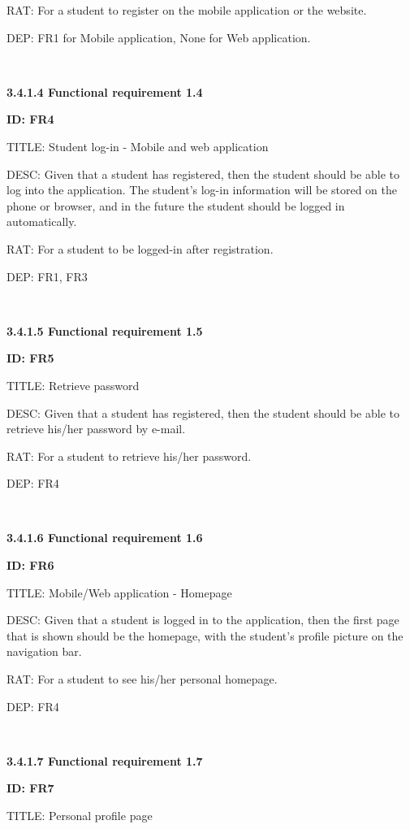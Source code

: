 \documentclass[12pt,a4paper]{article}
\begin{document}
\begin{flushleft}
        RAT: For a student to register on the mobile application or the website.

        DEP: FR1 for Mobile application, None for Web application.


        \
\newpage


        \textbf{3.4.1.4 Functional requirement 1.4}

        \textbf{ID: FR4}

        TITLE: Student log-in - Mobile and web application

        DESC: Given that a student has registered, then the student should be
        able to log into the application. The student's log-in information will
        be stored on the phone or browser, and in the future the student should
        be logged in automatically.

        RAT: For a student to be logged-in after registration.

        DEP: FR1, FR3


        \

        \textbf{3.4.1.5 Functional requirement 1.5}

        \textbf{ID: FR5}

        TITLE: Retrieve password

        DESC: Given that a student has registered, then the student should be
        able to retrieve his/her password by e-mail.

        RAT: For a student to retrieve his/her password.

        DEP: FR4

        \

        \textbf{3.4.1.6 Functional requirement 1.6}

        \textbf{ID: FR6}

        TITLE: Mobile/Web application - Homepage

        DESC: Given that a student is logged in to the application, then the
        first page that is shown should be the homepage, with the student's
        profile picture on the navigation bar.

        RAT: For a student to see his/her personal homepage.

        DEP: FR4

        \

        \textbf{3.4.1.7 Functional requirement 1.7}

        \textbf{ID: FR7}

        TITLE: Personal profile page


\end{flushleft}
\end{document}
